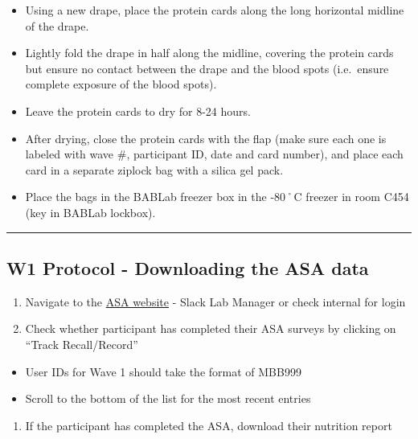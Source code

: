 \documentclass[]{book}
\providecommand{\tightlist}{%
  \setlength{\itemsep}{0pt}\setlength{\parskip}{0pt}}
\begin{document}
\begin{itemize}
\tightlist
\item
  Using a new drape, place the protein cards along the long horizontal midline of the drape.
\item
  Lightly fold the drape in half along the midline, covering the protein cards but ensure no contact between the drape and the blood spots (i.e.~ensure complete exposure of the blood spots).
\item
  Leave the protein cards to dry for 8-24 hours.
\item
  After drying, close the protein cards with the flap (make sure each one is labeled with wave \#, participant ID, date and card number), and place each card in a separate ziplock bag with a silica gel pack.
\item
  Place the bags in the BABLab freezer box in the -80˚C freezer in room C454 (key in BABLab lockbox).
\end{itemize}

\begin{center}\rule{0.5\linewidth}{0.5pt}\end{center}

\hypertarget{w1-protocol---downloading-the-asa-data}{%
\subsection{W1 Protocol - Downloading the ASA data}\label{w1-protocol---downloading-the-asa-data}}

\begin{enumerate}
\def\labelenumi{\arabic{enumi}.}
\tightlist
\item
  Navigate to the \href{https://asa24.nci.nih.gov}{ASA website} - Slack Lab Manager or check internal for login
\item
  Check whether participant has completed their ASA surveys by clicking on ``Track Recall/Record''
\end{enumerate}

\begin{itemize}
\tightlist
\item
  User IDs for Wave 1 should take the format of MBB999
\item
  Scroll to the bottom of the list for the most recent entries
\end{itemize}

\begin{enumerate}
\def\labelenumi{\arabic{enumi}.}
\setcounter{enumi}{2}
\tightlist
\item
  If the participant has completed the ASA, download their nutrition report
\end{enumerate}
\end{document}
